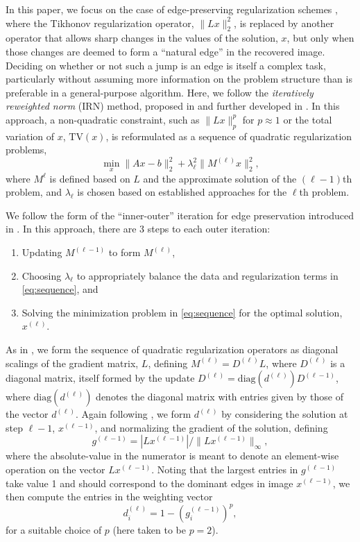 In this paper, we focus on the case of edge-preserving regularization
schemes \cite{CRVogel_2002a, Gazzola_etal_2020}, where the
Tikhonov regularization operator, $\|Lx\|^2_2$, is replaced by another
operator that allows sharp
changes in the values of the solution, $x$, but only when those
changes are deemed to form a ``natural edge'' in the recovered image.
Deciding on whether or not such a jump is an edge is itself a complex
task, particularly without assuming more information on the problem
structure than is preferable in a general-purpose algorithm.  Here, we
follow the \textit{iteratively reweighted norm} (IRN) method, proposed
in \cite{Gorodnitsky_Rao_1992} and further developed in
\cite{Rodriguez_Wohlberg, RARenaut_etal_2017}. In this approach, a non-quadratic
constraint, such as $\|Lx\|_p^p$ for $p\approx 1$ or the total
variation of $x$, $\mathrm{TV}(x)$, is reformulated as a sequence of
quadratic regularization problems,
\begin{equation}
\label{eq:sequence}
\min_{x} \| A x - b \|_2^2 + \lambda_\ell^2 \| M^{(\ell)} x \|_2^2,
\end{equation}
where $M^{\ell}$ is defined based on $L$ and the approximate solution
of the $(\ell-1)$th problem, and $\lambda_\ell$ is chosen based on
established approaches for the $\ell$th problem.

We follow the form of the ``inner-outer'' iteration for
edge preservation introduced in \cite{Gazzola_etal_2020}.  In this
approach, there are 3 steps to each outer iteration:
\begin{enumerate}
\item Updating $M^{(\ell-1)}$ to form $M^{(\ell)}$,
\item Choosing $\lambda_\ell$ to appropriately balance the data and
  regularization terms in \eqref{eq:sequence}, and
\item Solving the minimization problem in \eqref{eq:sequence} for the
  optimal solution, $x^{(\ell)}$.
\end{enumerate}
As in \cite{Gazzola_etal_2020}, we form the sequence of quadratic
regularization operators as diagonal scalings of the gradient matrix,
$L$, defining $M^{(\ell)} = D^{(\ell)}L$, where $D^{(\ell)}$ is a
diagonal matrix, itself formed by the update $D^{(\ell)} =
\text{diag}(d^{(\ell)})D^{(\ell-1)}$, where $\text{diag}(d^{(\ell)})$
denotes the diagonal matrix with entries given by those of the vector
$d^{(\ell)}$.  Again following \cite{Gazzola_etal_2020}, we form
$d^{(\ell)}$ by considering the solution at step $\ell-1$,
$x^{(\ell-1)}$, and normalizing the gradient of the solution, defining
\[
g^{(\ell-1)} = |Lx^{(\ell-1)}| / \|Lx^{(\ell-1)}\|_\infty,
\]
where the absolute-value in the numerator is meant to denote an
element-wise operation on the vector $Lx^{(\ell-1)}$.  Noting that the
largest entries in $g^{(\ell-1)}$ take value 1 and should correspond
to the dominant edges in image $x^{(\ell-1)}$, we then compute the
entries in the weighting vector
\[
d^{(\ell)}_i = 1 - \left(g^{(\ell-1)}_i\right)^p,
\]
for a suitable choice of $p$ (here taken to be $p=2$).

